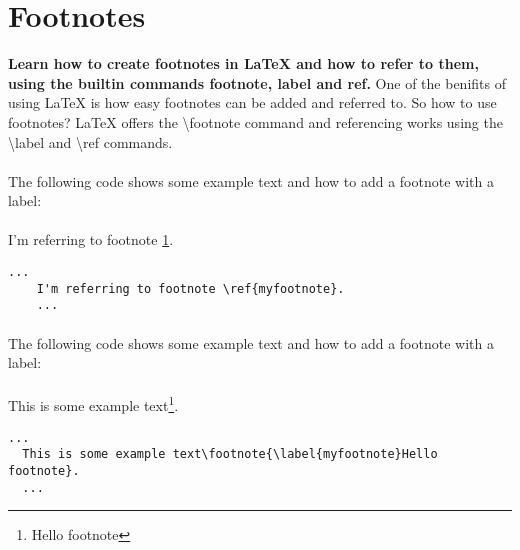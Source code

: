 
\maketitle
\newpage
\section{Footnotes}
  \textbf{
    Learn how to create footnotes in LaTeX and how to refer to them, using the builtin commands footnote, label and ref.
  }
  One of the benifits of using LaTeX is how easy footnotes can be added and referred to. So how to use footnotes? LaTeX offers the \textbackslash footnote command and referencing works using the \textbackslash label and \textbackslash ref commands.

  \paragraph{}
  The following code shows some example text and how to add a footnote with a label:
  \paragraph{}
  I'm referring to footnote \ref{myfootnote}.
  \begin{lstlisting}[language={[LaTeX]TeX},breaklines=true,frame=single]
    ...
    I'm referring to footnote \ref{myfootnote}.
    ...
  \end{lstlisting}

  \paragraph{}
  The following code shows some example text and how to add a footnote with a label:
  \paragraph{}
  This is some example text\footnote{\label{myfootnote}Hello footnote}.
  \begin{lstlisting}[language={[LaTeX]TeX},breaklines=true,frame=single]
  ...
  This is some example text\footnote{\label{myfootnote}Hello footnote}.
  ...
  \end{lstlisting}



